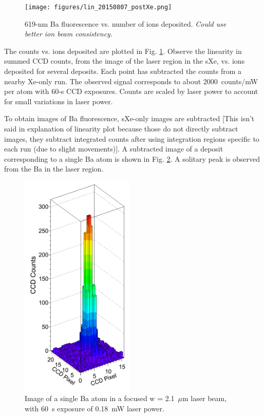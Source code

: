 \documentclass[aps,pra,reprint,superscriptaddress]{revtex4-1}
\begin{document}
\begin{figure}
\texttt{[image: figures/lin\_20150807\_postXe.png]}
\caption{619-nm Ba fluorescence vs. number of ions deposited.  {\color{blue}\emph{Could use better ion beam consistency.}}}
\label{fig:ctsVsIons}
\end{figure}

The counts vs. ions deposited are plotted in Fig. \ref{fig:ctsVsIons}.  Observe the linearity in summed CCD counts, from the image of the laser region in the sXe, vs. ions deposited for several deposits.  Each point has subtracted the counts from a nearby Xe-only run.  The observed signal corresponds to about 2000~counts/mW per atom with 60-s CCD exposures.  Counts are scaled by laser power to account for small variations in laser power.

To obtain images of Ba fluorescence, sXe-only images are subtracted {\color{gray}[This isn't said in explanation of linearity plot because those do not directly subtract images, they subtract integrated counts after using integration regions specific to each run (due to slight movements)]}.  A subtracted image of a deposit corresponding to a single Ba atom is shown in Fig. \ref{fig:lego}.  A solitary peak is observed from the Ba in the laser region.


\begin{figure}
\includegraphics[width=0.48\textwidth]{figures/lego_near-line_1-atom.png}
\caption{Image of a single Ba atom in a focused w = 2.1~$\mu$m laser beam, with 60~s exposure of 0.18~mW laser power.}
\label{fig:lego}
\end{figure}
\end{document}

